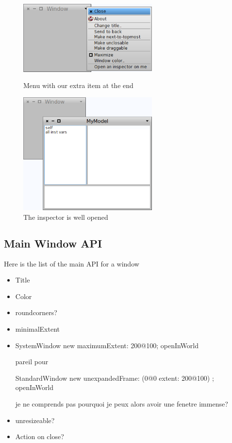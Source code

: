 \documentclass[a4paper,10pt,twoside]{book}
\begin{document}
\begin{figure}[ht]\centering
	\includegraphics[width=7cm]{MenuBar}
	\caption{Menu with our extra item at the end}
	\label{fig:menuBar}
	\includegraphics[width=7cm]{WindowAndInspector}
	\caption{The inspector is well opened}
	\label{fig:windowAndInspector}
\end{figure}

\subsection{Main Window API}

Here is the list of the main API for a window

\begin{itemize}
\item Title
\item Color
\item roundcorners?
\item minimalExtent
\item 

\begin{code}{}
SystemWindow new
	maximumExtent: 200@100; openInWorld

pareil pour 

StandardWindow new
	unexpandedFrame: (0@0 extent: 200@100) ; openInWorld
\end{code}

je ne comprends pas pourquoi je peux alors avoir une fenetre immense?

\item unresizeable?
\item Action on close?
\end{itemize}
\end{document}
